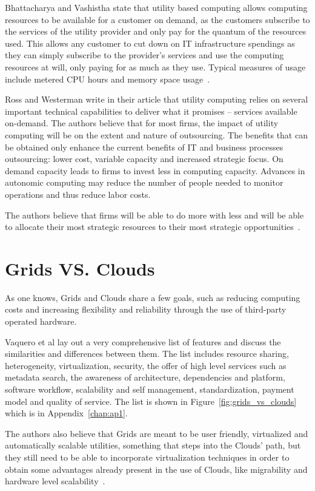 Bhattacharya and Vashistha state that utility based computing allows computing resources to be available for a customer on demand, as the customers subscribe to the services of the utility provider and only pay for the quantum of the resources used. This allows any customer to cut down on IT infrastructure spendings as they can simply subscribe to the provider's services and use the computing resources at will, only paying for as much as they use. Typical measures of usage include metered CPU hours and memory space usage~\cite{bhatta-utility}.

Ross and Westerman write in their article that utility computing relies on several important technical capabilities to deliver what it promises -- services available on-demand. The authors believe that for most firms, the impact of utility computing will be on the extent and nature of outsourcing. The benefits that can be obtained only enhance the current benefits of IT and business processes outsourcing: lower cost, variable capacity and increased strategic focus. On demand capacity leads to firms to invest less in computing capacity. Advances in autonomic computing may reduce the number of people needed to monitor operations and thus reduce labor costs.

The authors believe that firms will be able to do more with less and will be able to allocate their most strategic resources to their most strategic opportunities~\cite{ross}.

\section{Grids VS. Clouds} \label{sec:gridsvsclouds}

As one knows, Grids and Clouds share a few goals, such as reducing computing costs and increasing flexibility and reliability through the use of third-party operated hardware.

Vaquero et al lay out a very comprehensive list of features and discuss the similarities and differences between them. The list includes resource sharing, heterogeneity, virtualization, security, the offer of high level services such as metadata search, the awareness of architecture, dependencies and platform, software workflow, scalability and self management, standardization, payment model and quality of service. The list is shown in Figure~\ref{fig:grids_vs_clouds} which is in Appendix~\ref{chap:ap1}.

The authors also believe that Grids are meant to be user friendly, virtualized and automatically scalable utilities, something that steps into the Clouds’ path, but they still need to be able to incorporate virtualization techniques in order to obtain some advantages already present in the use of Clouds, like migrability and hardware level scalability~\cite{vaquero}.

